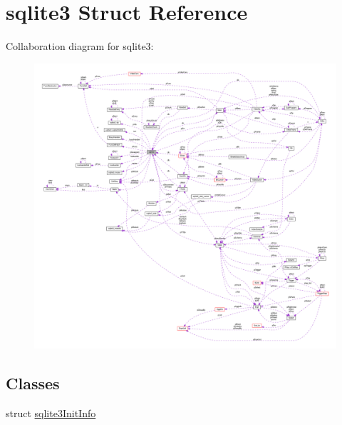 \hypertarget{structsqlite3}{\section{sqlite3 Struct Reference}
\label{structsqlite3}
}


Collaboration diagram for sqlite3\-:\nopagebreak
\begin{figure}[H]
\begin{center}
\leavevmode
\includegraphics[width=350pt]{structsqlite3__coll__graph}
\end{center}
\end{figure}
\subsection*{Classes}
\begin{DoxyCompactItemize}
\item 
struct \hyperlink{structsqlite3_1_1sqlite3_init_info}{sqlite3\-Init\-Info}
\end{DoxyCompactItemize}
